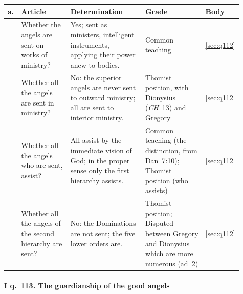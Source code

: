 \begingroup\footnotesize
\begin{longtable}{>{\raggedright\arraybackslash}p{0.03\linewidth}>{\raggedright\arraybackslash}p{0.22\linewidth}>{\raggedright\arraybackslash}p{0.33\linewidth}>{\raggedright\arraybackslash}p{0.27\linewidth}>{\raggedright\arraybackslash}p{0.06\linewidth}}
\toprule
\textbf{a.} & \textbf{Article} & \textbf{Determination} & \textbf{Grade} & \textbf{Body}\\
\midrule
\endhead
1 & Whether the angels are sent on works of ministry? & Yes; sent as ministers, intelligent instruments, applying their power anew to bodies. & Common teaching & \ref{sec:q112}\\
2 & Whether all the angels are sent in ministry? & No: the superior angels are never sent to outward ministry; all are sent to interior ministry. & Thomist position, with Dionysius (\emph{CH}~13) and Gregory & \ref{sec:q112}\\
3 & Whether all the angels who are sent, assist? & All assist by the immediate vision of God; in the proper sense only the first hierarchy assists. & Common teaching (the distinction, from Dan~7:10); Thomist position (who assists) & \ref{sec:q112}\\
4 & Whether all the angels of the second hierarchy are sent? & No: the Dominations are not sent; the five lower orders are. & Thomist position; Disputed between Gregory and Dionysius which are more numerous (ad~2) & \ref{sec:q112}\\
\bottomrule
\end{longtable}
\endgroup

\paragraph{I q.~113. The guardianship of the good angels}

